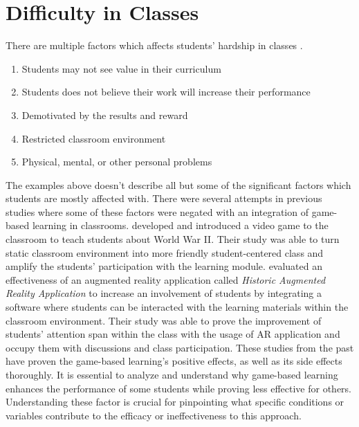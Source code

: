\section{Difficulty in Classes}
There are multiple factors which affects students' hardship in classes \cite{cmu}.
\begin{enumerate}
    \item Students may not see value in their curriculum
    \item Students does not believe their work will increase their performance
    \item Demotivated by the results and reward
    \item Restricted classroom environment
    \item Physical, mental, or other personal problems
\end{enumerate}
The examples above doesn't describe all but some of the significant factors which students are mostly affected with. There were several attempts in previous studies where some of these factors were negated with an integration of game-based learning in classrooms. \cite{watson2011} developed and introduced a video game to the classroom to teach students about World War II. Their study was able to turn static classroom environment into more friendly student-centered class and amplify the students' participation with the learning module. \cite{Hara} evaluated an effectiveness of an augmented reality application called \textit{Historic Augmented Reality Application} to increase an involvement of students by integrating a software where students can be interacted with the learning materials within the classroom environment. Their study was able to prove the improvement of students' attention span within the class with the usage of AR application and occupy them with discussions and class participation. These studies from the past have proven the game-based learning's positive effects, as well as its side effects thoroughly. It is essential to analyze and understand why game-based learning enhances the performance of some students while proving less effective for others. Understanding these factor is crucial for pinpointing what specific conditions or variables contribute to the efficacy or ineffectiveness to this approach.

